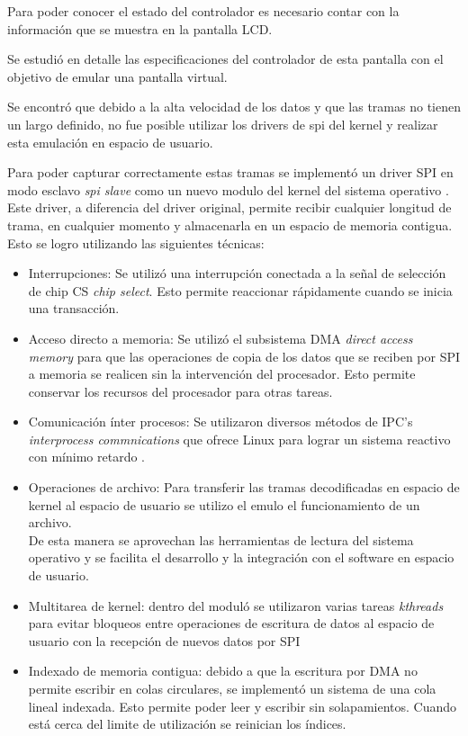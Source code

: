       Para poder conocer el estado del controlador es necesario contar con la información que se muestra en la pantalla LCD.\par
      Se estudió en detalle las especificaciones del controlador de esta pantalla con el objetivo de emular una pantalla virtual.\par
      Se encontró que debido a la alta velocidad de los datos y que las tramas no tienen un largo definido, no fue posible utilizar los drivers de spi del kernel y realizar esta emulación en espacio de usuario.\par
      Para poder capturar correctamente estas tramas se implementó un driver SPI en modo esclavo \textit{spi slave} como un nuevo modulo del kernel del sistema operativo \citep{book:ldd3}.
      Este driver, a diferencia del driver original, permite recibir cualquier longitud de trama, en cualquier momento y almacenarla en un espacio de memoria contigua.
      Esto se logro utilizando las siguientes técnicas:
      \begin{itemize}
         \item {Interrupciones: Se utilizó una interrupción conectada a la señal de selección de chip CS \textit{chip select}. Esto permite reaccionar rápidamente cuando se inicia una transacción.}
         \item {Acceso directo a memoria: Se utilizó el subsistema DMA \textit{direct access memory} para que las operaciones de copia de los datos que se reciben por SPI a memoria se realicen sin la intervención del procesador. Esto permite conservar los recursos del procesador para otras tareas.}
         \item{Comunicación ínter procesos: Se utilizaron diversos métodos de IPC's \textit{interprocess commnications} que ofrece Linux para lograr un sistema reactivo con mínimo retardo \citep{book:ldd3}.}
         \item{Operaciones de archivo: Para transferir las tramas decodificadas en espacio de kernel al espacio de usuario se utilizo el emulo el funcionamiento de un archivo.\\ De esta manera se aprovechan las herramientas de lectura del sistema operativo y se facilita el desarrollo y la integración con el software en espacio de usuario.}
         \item{Multitarea de kernel: dentro del moduló se utilizaron varias tareas \textit{kthreads} para evitar bloqueos entre operaciones de escritura de datos al espacio de usuario con la recepción de nuevos datos por SPI}
         \item{Indexado de memoria contigua: debido a que la escritura por DMA no permite escribir en colas circulares, se implementó un sistema de una cola lineal indexada. Esto permite poder leer y escribir sin solapamientos. Cuando está cerca del limite de utilización se reinician los índices.}
      \end{itemize}

